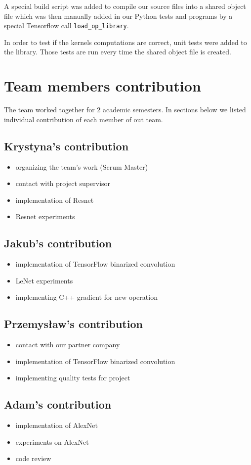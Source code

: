 \documentclass[licencjacka]{pracamgr}
\begin{document}
		A special build script was added to compile our source files into a shared object file which was then manually added in our Python tests and programs by a special Tensorflow call \texttt{load\_op\_library}.

		In order to test if the kernels computations are correct, unit tests were added to the library. Those tests are run every time the shared object file is created.
	
	\chapter{Team members contribution}
	The team worked together for 2 academic semesters. In sections below we listed individual contribution of each member of out team.
	\section{Krystyna's contribution}
		\begin{itemize}
			\item organizing the team's work (Scrum Master)
			\item contact with project supervisor
			\item implementation of Resnet
			\item Resnet experiments
		\end{itemize}
	\section{Jakub's contribution}
		\begin{itemize}
			\item implementation of TensorFlow binarized convolution
			\item LeNet experiments
			\item implementing C++ gradient for new operation
		\end{itemize}
	\section{Przemysław's contribution}
		\begin{itemize}
			\item contact with our partner company
			\item implementation of TensorFlow binarized convolution
			\item implementing quality tests for project
		\end{itemize}
	\section{Adam's contribution}
		\begin{itemize}
			\item implementation of AlexNet
			\item experiments on AlexNet
			\item code review 
		\end{itemize}
\end{document}
